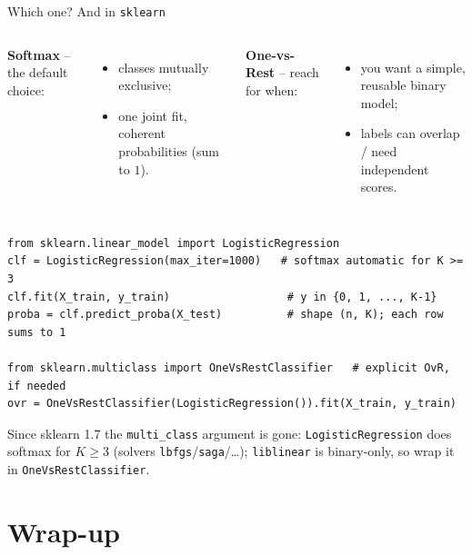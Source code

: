 \documentclass[aspectratio=169]{beamer}
\begin{document}
\begin{frame}[fragile]{Which one? And in \texttt{sklearn}}
  \begin{columns}[T]
    \textbf{Softmax} -- the default choice:
    \begin{itemize}\small
      \item classes mutually exclusive;
      \item one joint fit, coherent probabilities (sum to $1$).
    \end{itemize}
    \textbf{One-vs-Rest} -- reach for when:
    \begin{itemize}\small
      \item you want a simple, reusable binary model;
      \item labels can overlap / need independent scores.
    \end{itemize}
  \end{columns}
  \vskip 4pt
\begin{lstlisting}
from sklearn.linear_model import LogisticRegression
clf = LogisticRegression(max_iter=1000)   # softmax automatic for K >= 3
clf.fit(X_train, y_train)                  # y in {0, 1, ..., K-1}
proba = clf.predict_proba(X_test)          # shape (n, K); each row sums to 1

from sklearn.multiclass import OneVsRestClassifier   # explicit OvR, if needed
ovr = OneVsRestClassifier(LogisticRegression()).fit(X_train, y_train)
\end{lstlisting}
  \vskip 1pt
  \footnotesize Since sklearn 1.7 the \texttt{multi\_class} argument is gone:
  \texttt{LogisticRegression} does softmax for $K\ge 3$ (solvers \texttt{lbfgs}/\texttt{saga}/\dots);
  \texttt{liblinear} is binary-only, so wrap it in \texttt{OneVsRestClassifier}.
\end{frame}

\section*{Wrap-up}
\end{document}
